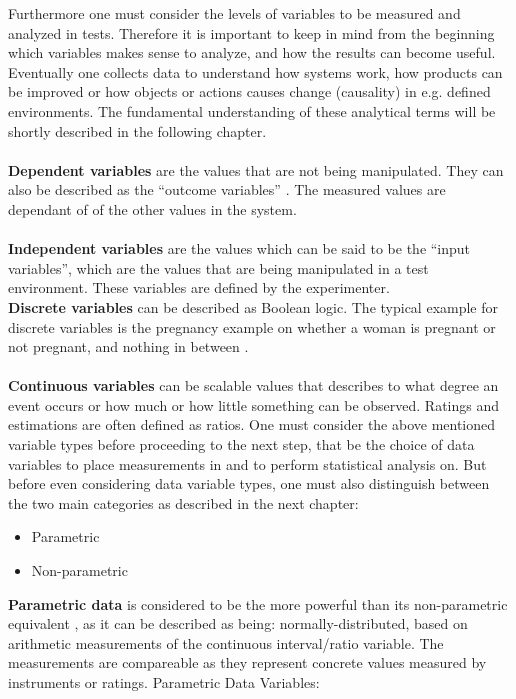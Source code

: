 Furthermore one must consider the levels of variables to be measured and analyzed in tests. Therefore it is important to keep in mind from the beginning which variables makes sense to analyze, and how the results can become useful. Eventually one collects data to understand how systems work, how products can be improved or how objects or actions causes change (causality) in e.g. defined environments. The fundamental understanding of these analytical terms will be shortly described in the following chapter.\\\\
\textbf{Dependent variables} are the values that are not being manipulated. They can also be described as the “outcome variables” \citep[page 21]{Design}. The measured values are dependant of of the other values in the system.\\\\
\textbf{Independent variables} are the values which can be said to be the “input variables”, which are the values that are being manipulated in a test environment. These variables are defined by the experimenter.\\
\textbf{Discrete variables} can be described as Boolean logic. The typical example for discrete variables is the pregnancy example on whether a woman is pregnant or not pregnant, and nothing in between \citep[page 9]{Design}.\\\\
\textbf{Continuous variables} can be scalable values that describes to what degree an event occurs or how much or how little something can be observed. Ratings and estimations are often defined as ratios. 
One must consider the above mentioned variable types before proceeding to the next step, that be the choice of data variables to place measurements in and to perform statistical analysis on. But before even considering data variable types, one must also distinguish between the two main categories as described in the next chapter: 
\begin{itemize}
\item Parametric
\item Non-parametric
\end{itemize}
\textbf{Parametric data} is considered to be the more powerful than its non-parametric equivalent \citep[page 21]{Design}, as it can be described as being: normally-distributed, based on arithmetic measurements of the continuous interval/ratio variable. The measurements are compareable as they represent concrete values measured by instruments or ratings.
Parametric Data Variables:
